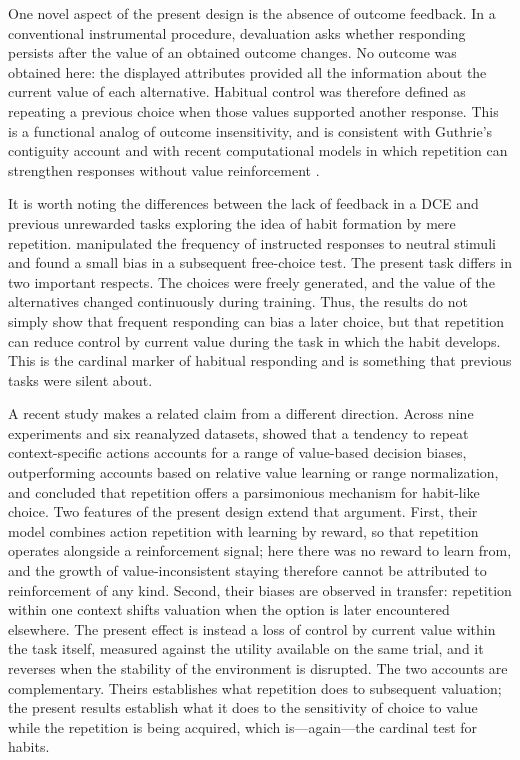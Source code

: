 \documentclass[man,natbib,floatsintext]{apa7}
\begin{document}
One novel aspect of the present design is the absence of outcome feedback. In a conventional instrumental procedure, devaluation asks whether responding persists after the value of an obtained outcome changes. No outcome was obtained here: the displayed attributes provided all the information about the current value of each alternative. Habitual control was therefore defined as repeating a previous choice when those values supported another response. This is a functional analog of outcome insensitivity, and is consistent with Guthrie's contiguity account and with recent computational models in which repetition can strengthen responses without value reinforcement \citep{guthrie1935, millerHabits2019}.

It is worth noting the differences between the lack of feedback in a DCE and previous unrewarded tasks exploring the idea of habit formation by mere repetition. \citet{nebe2024} manipulated the frequency of instructed responses to neutral stimuli and found a small bias in a subsequent free-choice test. The present task differs in two important respects. The choices were freely generated, and the value of the alternatives changed continuously during training. Thus, the results do not simply show that frequent responding can bias a later choice, but that repetition can reduce control by current value during the task in which the habit develops. This is the cardinal marker of habitual responding and is something that previous tasks were silent about.

A recent study makes a related claim from a different direction. Across nine experiments and six reanalyzed datasets, \citet{wagner2025} showed that a tendency to repeat context-specific actions accounts for a range of value-based decision biases, outperforming accounts based on relative value learning or range normalization, and concluded that repetition offers a parsimonious mechanism for habit-like choice. Two features of the present design extend that argument. First, their model combines action repetition with learning by reward, so that repetition operates alongside a reinforcement signal; here there was no reward to learn from, and the growth of value-inconsistent staying therefore cannot be attributed to reinforcement of any kind. Second, their biases are observed in transfer: repetition within one context shifts valuation when the option is later encountered elsewhere. The present effect is instead a loss of control by current value within the task itself, measured against the utility available on the same trial, and it reverses when the stability of the environment is disrupted. The two accounts are complementary. Theirs establishes what repetition does to subsequent valuation; the present results establish what it does to the sensitivity of choice to value while the repetition is being acquired, which is---again---the cardinal test for habits.
\end{document}
